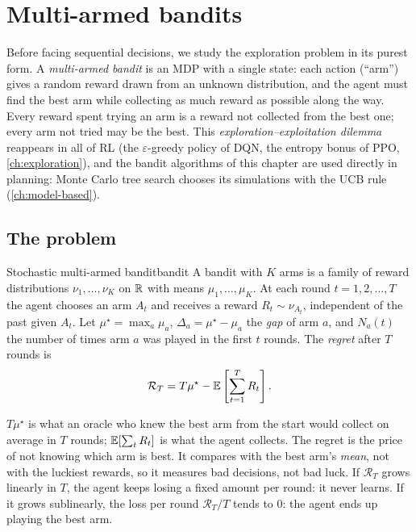 \chapter{Multi-armed bandits}
\label{ch:bandits}

Before facing sequential decisions, we study the exploration problem in its
purest form. A \emph{multi-armed bandit} is an MDP with a single state:
each action (``arm'') gives a random reward drawn from an unknown
distribution, and the agent must find the best arm while collecting as much
reward as possible along the way. Every reward spent trying an arm is a
reward not collected from the best one; every arm not tried may be the
best. This \emph{exploration--exploitation dilemma} reappears in all of RL
(the $\varepsilon$-greedy policy of DQN, the entropy bonus of PPO,
\cref{ch:exploration}), and the bandit algorithms of this chapter are used
directly in planning: Monte Carlo tree search chooses its simulations with
the UCB rule (\cref{ch:model-based}).

\section{The problem}

\begin{definition}{Stochastic multi-armed bandit}{bandit}
  A bandit with $K$ arms is a family of reward distributions $\nu_1, \dots,
  \nu_K$ on $\mathbb{R}$ with means $\mu_1, \dots, \mu_K$. At each round $t = 1, 2,
  \dots, T$ the agent chooses an arm $A_t$ and receives a reward $R_t \sim
  \nu_{A_t}$, independent of the past given $A_t$. Let $\mu^\star = \max_a
  \mu_a$, $\Delta_a = \mu^\star - \mu_a$ the \emph{gap} of arm $a$, and
  $N_a(t)$ the number of times arm $a$ was played in the first $t$ rounds.
  The \emph{regret} after $T$ rounds is
  \begin{equation}
    \mathcal{R}_T = T \mu^\star - \mathbb{E}\left[ \sum_{t=1}^{T} R_t \right].
  \end{equation}
\end{definition}

\begin{intuition}
  $T \mu^\star$ is what an oracle who knew the best arm from the start
  would collect on average in $T$ rounds; $\mathbb{E}[\sum_t R_t]$ is what the
  agent collects. The regret is the price of not knowing which arm is best.
  It compares with the best arm's \emph{mean}, not with the luckiest
  rewards, so it measures bad decisions, not bad luck. If $\mathcal{R}_T$
  grows linearly in $T$, the agent keeps losing a fixed amount per round:
  it never learns. If it grows sublinearly, the loss per round
  $\mathcal{R}_T / T$ tends to $0$: the agent ends up playing the best arm.
\end{intuition}

